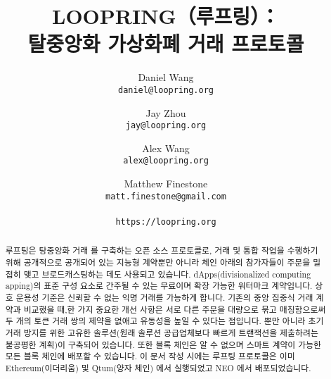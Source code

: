 \documentclass{article}
\title{\textbf{LOOPRING（루프링）：\\ 탈중앙화 가상화폐 거래 프로토콜}}
\author{	
	Daniel Wang\\	
	\texttt{daniel@loopring.org}\\	
	\and	
	Jay Zhou\\	
	\texttt{jay@loopring.org}\\	
	\and	
	Alex Wang\\	
	\texttt{alex@loopring.org}\\	
	\and	
	Matthew Finestone\\	
	\texttt{matt.finestone@gmail.com}\\	
	\\	
	\texttt{https://loopring.org}	
}
\begin{document}
\maketitle
\begin{abstract}
	
	 루프팅은 탕중앙화 거래 를 구축하는 오픈 소스 프로토콜로, 거래 및 통합 작업을 수행하기 위해 공개적으로 공개되어 있는 지능형 계약뿐만 아니라 체인 아래의 참가자들이 주문을 밀접히 맺고 브로드캐스팅하는 데도 사용되고 있습니다. dApps(divisionalized computing apping)의 표준 구성 요소로 간주될 수 있는 무료이며 확장 가능한 워터마크 계약입니다. 상호 운용성 기준은 신뢰할 수 없는 익명 거래를 가능하게 합니다. 기존의 중앙 집중식 거래 계약과 비교했을 때,한 가지 중요한 개선 사항은 서로 다른 주문을 대량으로 묶고 매칭함으로써 두 개의 토큰 거래 쌍의 제약을 없애고 유동성을 높일 수 있다는 점입니다. 뿐만 아니라 초기 거래 방지를 위한 고유한 솔루션(원래 솔루션 공급업체보다 빠르게 트랜잭션을 제출하려는 불공평한 계획)이 구축되어 있습니다. 또한 블록 체인은 알 수 없으며 스마트 계약이 가능한 모든 블록 체인에 배포할 수 있습니다. 이 문서 작성 시에는 루프팅 프로토콜은 이미 Ethereum(이더리움) \cite{buterin2017ethereum} \cite{wood2014ethereum} 및 Qtum(양자 체인) \cite{dai2017smart}에서 실행되었고 NEO \cite{atterlonn2018distributed}에서 배포되었습니다.
	
\end{abstract}
\end{document}

